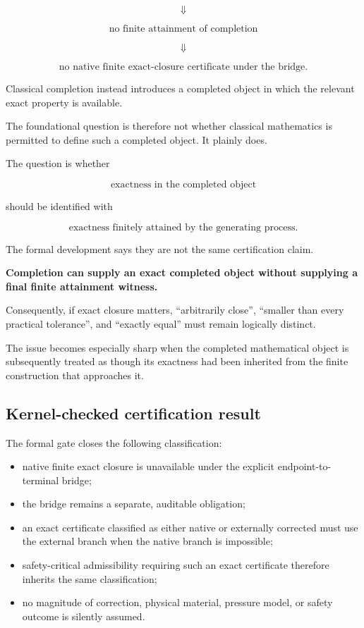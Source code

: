 \documentclass[11pt,a4paper]{article}
\begin{document}
\[
\Downarrow
\]

\[
\text{no finite attainment of completion}
\]

\[
\Downarrow
\]

\[
\text{no native finite exact-closure certificate under the bridge}.
\]

Classical completion instead introduces a completed object in which the
relevant exact property is available.

The foundational question is therefore not whether classical mathematics
is permitted to define such a completed object. It plainly does.

The question is whether

\[
\text{exactness in the completed object}
\]

should be identified with

\[
\text{exactness finitely attained by the generating process}.
\]

The formal development says they are not the same certification claim.

\begin{center}
\textbf{Completion can supply an exact completed object without supplying a final finite attainment witness.}
\end{center}

Consequently, if exact closure matters, ``arbitrarily close'', ``smaller
than every practical tolerance'', and ``exactly equal'' must remain
logically distinct.

The issue becomes especially sharp when the completed mathematical object
is subsequently treated as though its exactness had been inherited from
the finite construction that approaches it.

\subsection{Kernel-checked certification result}

The formal gate closes the following classification:

\begin{itemize}
\item native finite exact closure is unavailable under the explicit
      endpoint-to-terminal bridge;
\item the bridge remains a separate, auditable obligation;
\item an exact certificate classified as either native or externally
      corrected must use the external branch when the native branch is
      impossible;
\item safety-critical admissibility requiring such an exact certificate
      therefore inherits the same classification;
\item no magnitude of correction, physical material, pressure model, or
      safety outcome is silently assumed.
\end{itemize}
\end{document}

